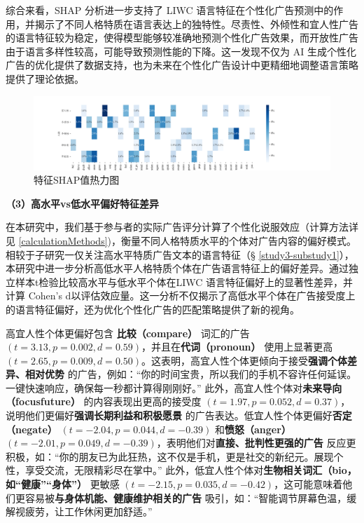 综合来看，SHAP 分析进一步支持了 LIWC 语言特征在个性化广告预测中的作用，并揭示了不同人格特质在语言表达上的独特性。尽责性、外倾性和宜人性广告的语言特征较为稳定，使得模型能够较准确地预测个性化广告效果，而开放性广告由于语言多样性较高，可能导致预测性能的下降。这一发现不仅为 AI 生成个性化广告的优化提供了数据支持，也为未来在个性化广告设计中更精细地调整语言策略提供了理论依据。

\begin{figure}[H]
    \centering
    \includegraphics[width=1.2\linewidth]{Image/Study3-heatmap.png}
    \caption{\label{fig:featureHeatmap}特征SHAP值热力图}
\end{figure}

\textbf{（3）高水平vs低水平偏好特征差异}

在本研究中，我们基于参与者的实际广告评分计算了个性化说服效应（计算方法详见 \ref{calculationMethods})，衡量不同人格特质水平的个体对广告内容的偏好模式。相较于子研究一仅关注高水平特质广告文本的语言特征（§ \ref{study3-substudy1}），本研究中进一步分析高低水平人格特质个体在广告语言特征上的偏好差异。通过独立样本t检验比较高水平与低水平个体在LIWC 语言特征偏好上的显著性差异，并计算 Cohen’s d以评估效应量。这一分析不仅揭示了高低水平个体在广告接受度上的语言特征偏好，还为优化个性化广告的匹配策略提供了新的视角。

高宜人性个体更偏好包含 \textbf{比较（compare）} 词汇的广告 \((t = 3.13, p = 0.002, d = 0.59)\)，并且在\textbf{代词（pronoun）} 使用上显著更高 \((t = 2.65, p = 0.009, d = 0.50)\)。这表明，高宜人性个体更倾向于接受\textbf{强调个体差异、相对优势} 的广告，例如：“你的时间宝贵，所以我们的手机不容许任何延误。一键快速响应，确保每一秒都计算得刚刚好。” 此外，高宜人性个体对\textbf{未来导向（focusfuture）} 的内容表现出更高的接受度 \((t = 1.97, p = 0.052, d = 0.37)\)，说明他们更偏好\textbf{强调长期利益和积极愿景} 的广告表达。低宜人性个体更偏好\textbf{否定（negate）} \((t = -2.04, p = 0.044, d = -0.39)\) 和\textbf{愤怒（anger）} \((t = -2.01, p = 0.049, d = -0.39)\)，表明他们对\textbf{直接、批判性更强的广告} 反应更积极，如：“你的朋友已为此狂热，这不仅是手机，更是社交的新纪元。展现个性，享受交流，无限精彩尽在掌中。” 此外，低宜人性个体对\textbf{生物相关词汇（bio，如“健康”“身体”）} 更敏感 \((t = -2.15, p = 0.035, d = -0.42)\)，这可能意味着他们更容易被\textbf{与身体机能、健康维护相关的广告} 吸引，如：“智能调节屏幕色温，缓解视疲劳，让工作休闲更加舒适。”

